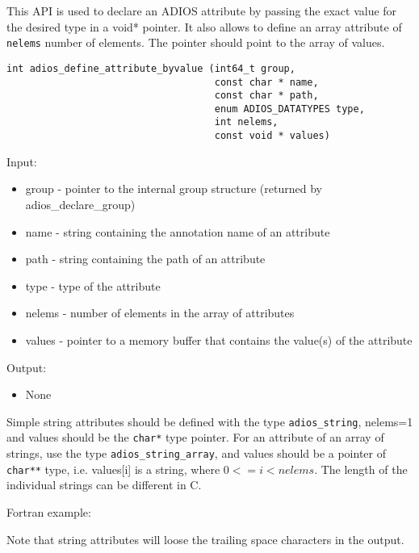 This API is used to declare an ADIOS attribute by passing the exact value for the desired type in a void* pointer. It also allows to define an array attribute of \verb+nelems+ number of elements. The pointer should point to the array of values. 

\begin{lstlisting}[alsolanguage=C,caption={},label={}]
int adios_define_attribute_byvalue (int64_t group,
                                    const char * name, 
                                    const char * path,
                                    enum ADIOS_DATATYPES type,
                                    int nelems,
                                    const void * values)
\end{lstlisting}

Input:
\begin{itemize}
\item group - pointer to the internal group structure (returned by adios\_declare\_group)

\item name - string containing the annotation name of an attribute

\item path - string containing the path of an attribute

\item type  - type of the attribute

\item nelems - number of elements in the array of attributes 

\item values - pointer to a memory buffer that contains the value(s) of the attribute
 
\end{itemize}

Output:
\begin{itemize}
\item None
\end{itemize}

Simple string attributes should be defined with the type \verb+adios_string+, nelems=1 and values should be the \verb+char*+ type pointer. For an attribute of an array of strings, use the type \verb+adios_string_array+, and values should be a pointer of \verb+char**+ type, i.e. values[i] is a string, where $0<=i<nelems$. The length of the individual strings can be different in C.

Fortran example: 

Note that string attributes will loose the trailing space characters in the output. 


